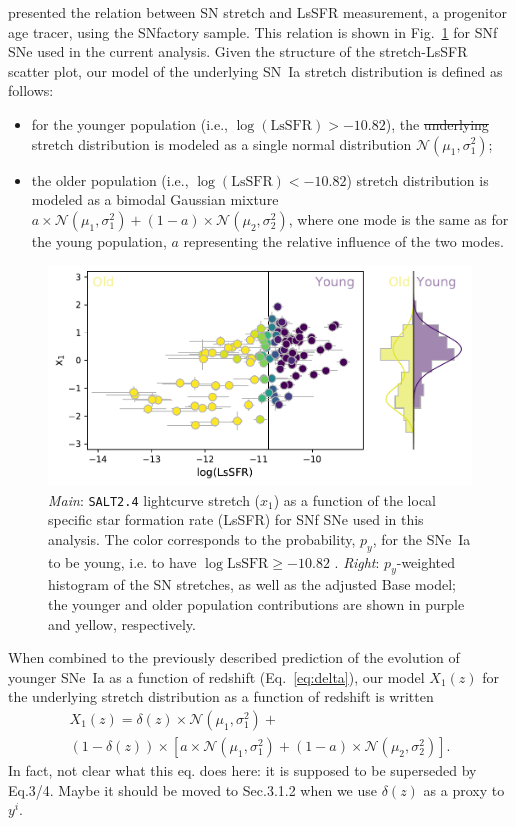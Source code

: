 \documentclass[]{aa} %
\newcommand{\yc}[1]{{\textcolor{BrickRed}{#1}}}
\begin{document}
\cite{rigault2018} presented the relation between SN stretch and LsSFR
measurement, \yc{a progenitor age tracer}, using the SNfactory sample. This
relation is shown in Fig.~\ref{fig:stretchlssfr} \yc{for SNf SNe used in the current analysis}. Given the structure of the
stretch-LsSFR scatter plot, our model of the underlying SN~Ia stretch
distribution is defined as follows:
\begin{itemize}
\item for the younger population (i.e., $\log(\mathrm{LsSFR})>-10.82$), the
\yc{\sout{underlying}} stretch distribution is modeled as a \yc{single} normal distribution
$\mathcal{N}(\mu_1, \sigma_1^2)$; 
\item the older population (i.e., $\log( \mathrm{LsSFR})<-10.82$) stretch
distribution is modeled as a \yc{bimodal} Gaussian mixture $a\times \mathcal{N}(\mu_1, \sigma_1^2) +
(1-a)\times \mathcal{N}(\mu_2, \sigma_2^2)$, 
where one mode is the same as for the young population, $a$
representing the relative influence of the two \yc{modes}.
\end{itemize}

\begin{figure}
    \centering
    \includegraphics[width=0.8\linewidth]{Article_figures/model_base_hist.pdf}
    \caption{\textit{Main}: \textsc{\texttt{SALT2.4}} lightcurve stretch ($x_1$)
        as a function of the local specific star formation rate (LsSFR) for SNf
        SNe used in this analysis. The color corresponds to the probability,
        $p_y$, for the SNe~Ia to be young, i.e. to have $\log\mathrm{LsSFR} \geq
        -10.82$ \citep[see][]{rigault2018}. \textit{Right}: $p_y$-weighted histogram of the SN stretches, \yc{as well as the adjusted Base model}; the younger and
    older population contributions are shown in purple and yellow, respectively.}
    \label{fig:stretchlssfr}
\end{figure}

When combined to the previously described prediction of the evolution of younger SNe~Ia as a function
of redshift (Eq.~\ref{eq:delta}), our model $X_1(z)$ for the underlying stretch distribution as a function of redshift is written
\begin{multline}
\label{eq:stretchz}
X_1(z) = 
\delta(z) \times \mathcal{N}(\mu_1,\sigma_1^2) + {} \\
(1 - \delta(z)) \times \left[a\times\mathcal{N}(\mu_1,\sigma_1^2) +
(1-a)\times\mathcal{N}(\mu_2,\sigma_2^2)\right].
\end{multline}
\yc{In fact, not clear what this eq. does here: it is supposed to be superseded by Eq.3/4. Maybe it should be moved to Sec.3.1.2 when we use $\delta(z)$ as a proxy to $y^i$.}
\end{document}
